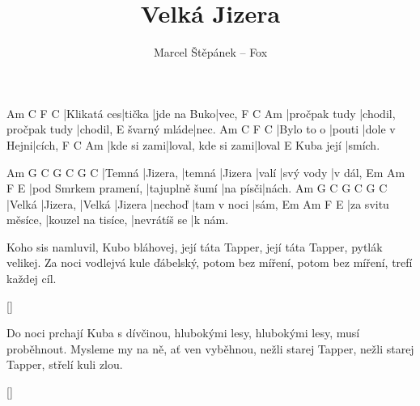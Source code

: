 \documentclass{song}
\title{Velká Jizera}
\author{Marcel Štěpánek -- Fox}
\begin{document}
\strophe
Am          C      F           C
|Klikatá ces|tička |jde na Buko|vec,
F             C                     Am
|pročpak tudy |chodil, pročpak tudy |chodil,
            E
švarný mláde|nec.
Am         C      F            C
|Bylo to o |pouti |dole v Hejni|cích,
F           C                  Am
|kde si zami|loval, kde si zami|loval
          E
Kuba její |smích.
\endstrophe

Am     G        C      G       C     G         C
|Temná |Jizera, |temná |Jizera |valí |svý vody |v dál,
Em                   Am             F        E
|pod Smrkem pramení, |tajuplně šumí |na písči|nách.
Am     G        C      G       C       G           C
|Velká |Jizera, |Velká |Jizera |nechoď |tam v noci |sám,
Em                Am                 F            E
|za svitu měsíce, |kouzel na tisíce, |nevrátíš se |k nám.
\endstrophe

\strophe*
Koho sis namluvil, Kubo bláhovej,
její táta Tapper, její táta Tapper,
pytlák velikej.
Za noci vodlejvá kule ďábelský,
potom bez míření, potom bez míření,
trefí každej cíl.
\endstrophe

\ref{}

\strophe*
Do noci prchají Kuba s dívčinou,
hlubokými lesy, hlubokými lesy,
musí proběhnout.
Mysleme my na ně, ať ven vyběhnou,
nežli starej Tapper, nežli starej Tapper,
střelí kuli zlou.
\endstrophe

\ref{}
\end{document}
